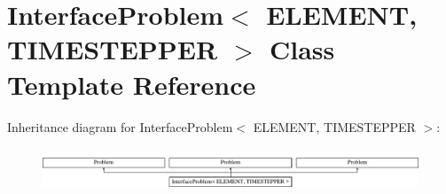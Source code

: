 \hypertarget{classInterfaceProblem}{}\section{Interface\+Problem$<$ E\+L\+E\+M\+E\+NT, T\+I\+M\+E\+S\+T\+E\+P\+P\+ER $>$ Class Template Reference}
\label{classInterfaceProblem}
Inheritance diagram for Interface\+Problem$<$ E\+L\+E\+M\+E\+NT, T\+I\+M\+E\+S\+T\+E\+P\+P\+ER $>$\+:\begin{figure}[H]
\begin{center}
\leavevmode
\includegraphics[height=1.282932cm]{classInterfaceProblem}
\end{center}
\end{figure}
